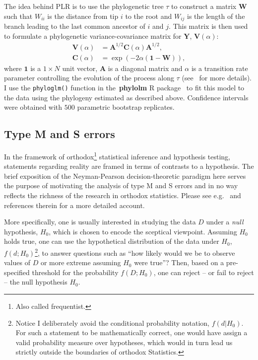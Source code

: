The idea behind PLR is to use the phylogenetic tree $\tau$ to construct a matrix $\boldsymbol W$ such that $W_{ii}$ is the distance from tip $i$ to the root and $W_{ij}$ is the length of the branch leading to the last common ancestor of $i$ and $j$.
This matrix is then used to formulate a phylogenetic variance-covariance matrix for $\boldsymbol Y$, $\boldsymbol V(\alpha)$:
\begin{align}
 \boldsymbol V(\alpha) &= \boldsymbol A^{1/2}  \boldsymbol C(\alpha)  \boldsymbol A^{1/2}, \\
  \boldsymbol C(\alpha) &= \exp\left(-2\alpha\left( \boldsymbol 1 - \boldsymbol W \right) \right), 
\end{align}
where $\boldsymbol 1$ is a $1 \times N$ unit vector, $\boldsymbol A$ is a diagonal matrix and $\alpha$ is a transition rate parameter controlling the evolution of the process along $\tau$ (see~\cite{Ives2009} for more details).
I use the \verb|phyloglm()| function in the~\textbf{phylolm} R package~\citep{Lam2014} to fit this model to the data using the phylogeny estimated as described above.
Confidence intervals were obtained with $500$ parametric bootstrap replicates.
 
\subsection{Type M and S errors}
\label{sec:MSerror}

In the framework of orthodox\footnote{Also called frequentist.} statistical inference and hypothesis testing, statements regarding reality are framed in terms of contrasts to a hypothesis.
The brief exposition of the Neyman-Pearson decision-theoretic paradigm here serves the purpose of motivating the analysis of type M and S errors and in no way reflects the richness of the research in orthodox statistics.
Please see e.g.~\cite{Casella2002} and references therein for a more detailed account.

More specifically, one is usually interested in studying the data $D$ under a \textit{null} hypothesis, $H_0$, which is chosen to encode the sceptical viewpoint.
Assuming $H_0$ holds true, one can use the hypothetical distribution of the data under $H_0$, $f(d; H_0)$\footnote{Notice I deliberately avoid the conditional probability notation, $f(d|H_0)$. For such a statement to be mathematically correct, one would have assign a valid probability measure over hypotheses, which would in turn lead us strictly outside the boundaries of orthodox Statistics.}, to answer questions such as ``how likely would we be to observe values of $D$ or more extreme assuming $H_0$ were true''?
Then, based on a pre-specified threshold for the probability $f(D; H_0)$, one can reject -- or fail to reject --  the null hypothesis $H_0$.

